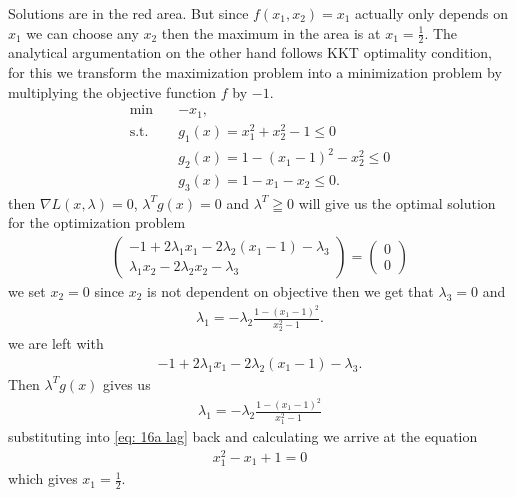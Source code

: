 Solutions are in the red area. But since $f(x_1, x_2) = x_1$ actually only depends
on $x_1$ we can choose any $x_2$ then the maximum in the area is at $x_1=
\frac{1}{2}$. The analytical argumentation on the other hand follows KKT
optimality condition, for this we transform the maximization problem into a
minimization problem by multiplying the objective function $f$ by $-1$.
\begin{align}
    \text{min}\quad & -x_1,\\
    \text{s.t.}\quad & g_1\left(x  \right) = x_1^{2} + x_2^{2} -1 \le 0 \nonumber\\
    &g_2(x) = 1- (x_1 - 1)^{2} - x_2^{2} \le 0 \nonumber\\
    &g_3(x) = 1- x_1 - x_2 \le 0\nonumber.
\end{align}
then $\nabla L(x, \lambda) =0$, $\lambda^{T}g(x) = 0$ and $\lambda^{T} \geqq
0 $ will give us the
optimal solution for the optimization problem
\begin{align}
    \begin{pmatrix}
        -1 + 2\lambda_1x_1 - 2\lambda_2(x_1 -1) - \lambda_3\\
        \lambda_1 x_2 - 2\lambda_2 x_2 - \lambda_3
    \end{pmatrix}
    =
    \begin{pmatrix} 0\\0 \end{pmatrix}
\end{align}
we set $x_2 = 0$ since $x_2$ is not dependent on objective then we get that
$\lambda_3 = 0$ and
\begin{align}
    \lambda_1 = -\lambda_2 \frac{1-(x_1 - 1)^{2}}{x_2^{2}-1}.
\end{align}
we are left with
\begin{align}
    -1 + 2\lambda_1x_1 - 2\lambda_2(x_1 -1) - \lambda_3.\label{eq: 16a lag}
\end{align}
Then $\lambda^{T}g(x)$ gives us
\begin{align}
    \lambda_1 = -\lambda_2 \frac{1-(x_1-1)^2}{x_1^{2} - 1}
\end{align}
substituting into \ref{eq: 16a lag} back and calculating we arrive at the equation
\begin{align}
    x_1^{2} - x_1 +1 = 0
\end{align}
which gives $x_1=\frac{1}{2}$.
